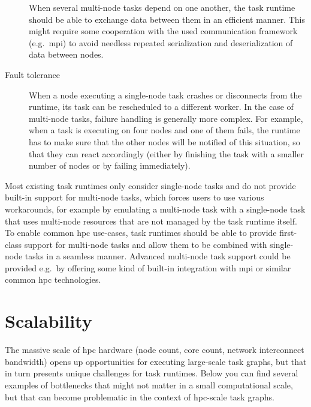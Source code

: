 \begin{description}
		When several multi-node tasks depend on one another, the task runtime should be able to exchange
		data between them in an efficient manner. This might require some cooperation with the used
		communication framework (e.g.\ \gls{mpi}) to avoid needless repeated serialization
		and deserialization of data between nodes.
	\item[Fault tolerance] When a node executing a single-node task crashes or disconnects from the runtime, its task can be
		rescheduled to a different worker. In the case of multi-node tasks, failure handling is generally
		more complex. For example, when a task is executing on four nodes and one of them fails, the
		runtime has to make sure that the other nodes will be notified of this situation, so that they can
		react accordingly (either by finishing the task with a smaller number of nodes or by failing
		immediately).
\end{description}

Most existing task runtimes only consider single-node tasks and do not provide built-in support for
multi-node tasks, which forces users to use various workarounds, for example by emulating a
multi-node task with a single-node task that uses multi-node resources that are not managed by the
task runtime itself. To enable common \gls{hpc} use-cases, task runtimes should
be able to provide first-class support for multi-node tasks and allow them to be combined with
single-node tasks in a seamless manner. Advanced multi-node task support could be provided e.g.\ by
offering some kind of built-in integration with \gls{mpi} or similar common
\gls{hpc} technologies.

\section{Scalability}
The massive scale of \gls{hpc} hardware (node count, core count, network
interconnect bandwidth) opens up opportunities for executing large-scale task graphs, but that in
turn presents unique challenges for task runtimes. Below you can find several examples of
bottlenecks that might not matter in a small computational scale, but that can become problematic
in the context of \gls{hpc}-scale task graphs.


